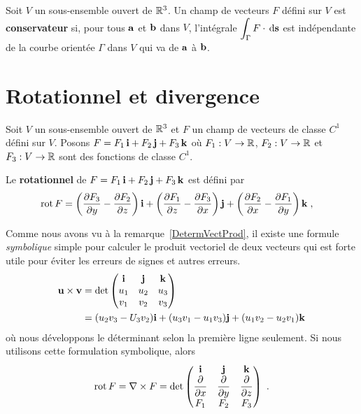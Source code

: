 {\begin{defn} 
Soit $V$ un sous-ensemble ouvert de $\mathbb{R}^3$.  Un champ de vecteurs
$F$ défini sur $V$ est {\bfseries  conservateur} si, pour tous
$\mathbf{a}$ et $\mathbf{b}$ dans $V$, l'intégrale
$\displaystyle \int_\Gamma F \cdot \,\mathrm{d}\mathbf{s}$ est
indépendante de la courbe orientée $\Gamma$ dans $V$ qui va de
$\mathbf{a}$ à $\mathbf{b}$.
\end{defn}

\section{Rotationnel et divergence}

Soit $V$ un sous-ensemble ouvert de $\mathbb{R}^3$ et $F$ un champ de
vecteurs de classe $C^1$ défini sur $V$.  Posons
$F = F_1\,\mathbf{i} + F_2\,\mathbf{j} + F_3\,\mathbf{k}$ où $F_1:V\rightarrow \mathbb{R}$,
$F_2:V\rightarrow \mathbb{R}$ et $F_3:V\rightarrow \mathbb{R}$ sont des fonctions de
classe $C^1$.

\begin{defn} 
Le {\bfseries rotationnel} de $F = F_1\,\mathbf{i} + F_2\,\mathbf{j} + F_3\,\mathbf{k}$
est défini par
\begin{equation*}
\begin{split}
\operatorname{rot} F & = \left( \frac{\partial F_3}{\partial y} - \frac{\partial F_2}{\partial z} \right) \mathbf{i} +
\left( \frac{\partial F_1}{\partial z} - \frac{\partial F_3}{\partial x} \right) \mathbf{j} +
\left( \frac{\partial F_2}{\partial x}- \frac{\partial F_1}{\partial y} \right) \mathbf{k} \; ,
\end{split}
\end{equation*}
\end{defn}

\begin{rmk}
Comme nous avons vu à la remarque~\ref{DetermVectProd}, il existe une formule
{\em symbolique} simple pour calculer le produit vectoriel de deux
vecteurs qui est forte utile pour éviter les erreurs de signes et
autres erreurs.
\begin{align*}
\mathbf{u} \times \mathbf{v} &= \det \begin{pmatrix}
\mathbf{i} & \mathbf{j} & \mathbf{k} \\
u_1 & u_2 & u_3 \\
v_1 & v_2 & v_3 \end{pmatrix} \\
&= (u_2 v_3 - U_3v_2)\mathbf{i} + (u_3 v_1 - u_1 v_3) \mathbf{j}
+ (u_1v_2 - u_2v_1) \mathbf{k}
\end{align*}
où nous développons le déterminant selon la première ligne seulement.
Si nous utilisons cette formulation symbolique, alors
\[
\operatorname{rot} F
= \nabla \times F
= \det \begin{pmatrix}
\mathbf{i} & \mathbf{j} & \mathbf{k} \\
\displaystyle \frac{\partial }{\partial x} & \displaystyle \frac{\partial }{\partial y} &
\displaystyle \frac{\partial }{\partial z} \\
F_1 & F_2 & F_3
\end{pmatrix} \ .
\]
\end{rmk}

}
